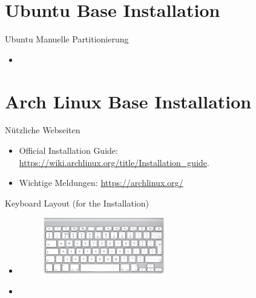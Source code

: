 
\section{Ubuntu Base Installation}

\begin{frame}[fragile]{Ubuntu Manuelle Partitionierung}
  \begin{itemize}
    \item
  \end{itemize}
\end{frame}

\section{Arch Linux Base Installation}

\begin{frame}[fragile]{Nützliche Webseiten}
  \begin{itemize}
    \item \alert{Official Installation Guide:} \url{https://wiki.archlinux.org/title/Installation_guide}.
    \item \alert{Wichtige Meldungen:} \url{https://archlinux.org/}
  \end{itemize}
\end{frame}

\begin{frame}[fragile]{Keyboard Layout (for the Installation)}
  \begin{itemize}
    \item {}
    \begin{figure}
      \includegraphics[width=0.5\textwidth]{./figures/keyboard.png}
    \end{figure}
    \item {}
  \end{itemize}
\end{frame}

